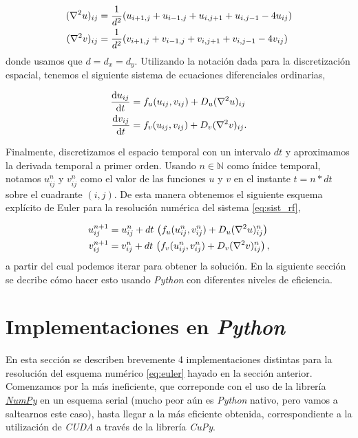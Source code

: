 \begin{equation}
  \begin{split}
    (\laplacian u)_{ij} &= \frac{1}{d^2}(u_{i+1,j}+u_{i-1,j}+u_{i,j+1}+u_{i,j-1}-4u_{ij})\\
    (\laplacian v)_{ij} &= \frac{1}{d^2}(v_{i+1,j}+v_{i-1,j}+v_{i,j+1}+v_{i,j-1}-4v_{ij})
    \label{eq:lap}
  \end{split}
\end{equation}
donde usamos que $d = d_x = d_y$.  Utilizando la notación dada para la discretización espacial, tenemos el siguiente sistema 
de ecuaciones diferenciales ordinarias,

\begin{equation}
  \begin{split}
  \dv{u_{ij}}{t} & = f_u(u_{ij},v_{ij}) + D_u (\laplacian u)_{ij} \\
  \dv{v_{ij}}{t} & = f_v(u_{ij},v_{ij}) + D_v (\laplacian v)_{ij}.
  \label{eq:sist_ord}
  \end{split}
\end{equation}

Finalmente, discretizamos el espacio temporal con un intervalo $dt$ y aproximamos la derivada temporal a primer orden. Usando $n\in \mathbb{N}$ como ínidce temporal, notamos $u_{ij}^n$ 
y $v_{ij}^n$ como el valor de las funciones $u$ y $v$ en el instante $t = n*dt$ sobre el cuadrante $(i,j)$. De esta manera obtenemos el siguiente 
esquema explícito de Euler para la resolución numérica del sistema \ref{eq:sist_rf},

\begin{equation}
  \begin{split}
    u_{ij}^{n+1} & = u_{ij}^n + dt \, \left(f_u(u_{ij}^n,v_{ij}^n) + D_u (\laplacian u)_{ij}^n\right) \\
    v_{ij}^{n+1} & = v_{ij}^n + dt \, \left(f_v(u_{ij}^n,v_{ij}^n) + D_v (\laplacian v)_{ij}^n\right),  
    \label{eq:euler}
  \end{split}
\end{equation}
a partir del cual podemos iterar para obtener la solución. En la siguiente sección se decribe cómo hacer esto usando \textit{Python} con diferentes niveles de eficiencia.


\section{Implementaciones en \textit{Python}}
\label{S:Python}

En esta sección se describen brevemente 4 implementaciones distintas para la resolución del esquema numérico \ref{eq:euler} hayado en la sección anterior. Comenzamos por 
la más ineficiente, que correponde con el uso de la librería \href{https://numpy.org/}{\textit{NumPy}} en un esquema serial (mucho peor aún es \textit{Python} nativo, pero vamos a saltearnos este caso), 
hasta llegar a la más eficiente obtenida, correspondiente a la utilización de \textit{CUDA} a través de la librería \textit{CuPy}. 

